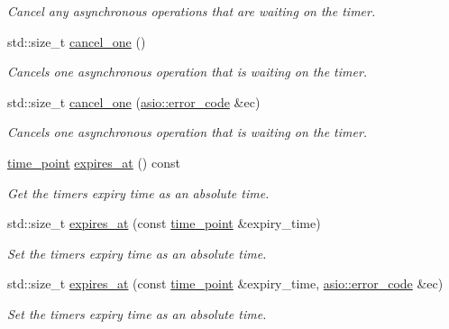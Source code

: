 \begin{DoxyCompactItemize}
\begin{DoxyCompactList}\small\item\em Cancel any asynchronous operations that are waiting on the timer. \end{DoxyCompactList}\item 
std\+::size\+\_\+t \hyperlink{classasio_1_1basic__waitable__timer_a84451b4a16cbdd72fd77ed3ddc959524}{cancel\+\_\+one} ()
\begin{DoxyCompactList}\small\item\em Cancels one asynchronous operation that is waiting on the timer. \end{DoxyCompactList}\item 
std\+::size\+\_\+t \hyperlink{classasio_1_1basic__waitable__timer_a5e05cbcbab1e177495c580cea18605bb}{cancel\+\_\+one} (\hyperlink{classasio_1_1error__code}{asio\+::error\+\_\+code} \&ec)
\begin{DoxyCompactList}\small\item\em Cancels one asynchronous operation that is waiting on the timer. \end{DoxyCompactList}\item 
\hyperlink{classasio_1_1basic__waitable__timer_a6f5aadc1aba86956b544ce107cfb49b0}{time\+\_\+point} \hyperlink{classasio_1_1basic__waitable__timer_abcc5c7ae917d2e7f02f6b6506997dae4}{expires\+\_\+at} () const 
\begin{DoxyCompactList}\small\item\em Get the timer\textquotesingle{}s expiry time as an absolute time. \end{DoxyCompactList}\item 
std\+::size\+\_\+t \hyperlink{classasio_1_1basic__waitable__timer_a26157baae69f83f938497cb78ae27d81}{expires\+\_\+at} (const \hyperlink{classasio_1_1basic__waitable__timer_a6f5aadc1aba86956b544ce107cfb49b0}{time\+\_\+point} \&expiry\+\_\+time)
\begin{DoxyCompactList}\small\item\em Set the timer\textquotesingle{}s expiry time as an absolute time. \end{DoxyCompactList}\item 
std\+::size\+\_\+t \hyperlink{classasio_1_1basic__waitable__timer_a53ae8940d9ccaefc4016e54c044f19ba}{expires\+\_\+at} (const \hyperlink{classasio_1_1basic__waitable__timer_a6f5aadc1aba86956b544ce107cfb49b0}{time\+\_\+point} \&expiry\+\_\+time, \hyperlink{classasio_1_1error__code}{asio\+::error\+\_\+code} \&ec)
\begin{DoxyCompactList}\small\item\em Set the timer\textquotesingle{}s expiry time as an absolute time. \end{DoxyCompactList}\item 

\end{DoxyCompactItemize}
